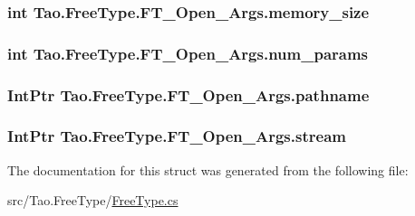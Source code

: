 \label{struct_tao_1_1_free_type_1_1_f_t___open___args_aafdbf467b031c162f7a0a8fd4f031f66}
\hypertarget{struct_tao_1_1_free_type_1_1_f_t___open___args_a2ad2c8ade3a312828754a9fccb93e2ac}{
\subsubsection[{memory\_\-size}]{\setlength{\rightskip}{0pt plus 5cm}int {\bf Tao.FreeType.FT\_\-Open\_\-Args.memory\_\-size}}}
\label{struct_tao_1_1_free_type_1_1_f_t___open___args_a2ad2c8ade3a312828754a9fccb93e2ac}
\hypertarget{struct_tao_1_1_free_type_1_1_f_t___open___args_a7c5a535b09dbf49db1abff2dfc435f09}{
\subsubsection[{num\_\-params}]{\setlength{\rightskip}{0pt plus 5cm}int {\bf Tao.FreeType.FT\_\-Open\_\-Args.num\_\-params}}}
\label{struct_tao_1_1_free_type_1_1_f_t___open___args_a7c5a535b09dbf49db1abff2dfc435f09}
\hypertarget{struct_tao_1_1_free_type_1_1_f_t___open___args_ad80d3dbe0301daf05ad1c81d97560d6b}{
\subsubsection[{pathname}]{\setlength{\rightskip}{0pt plus 5cm}IntPtr {\bf Tao.FreeType.FT\_\-Open\_\-Args.pathname}}}
\label{struct_tao_1_1_free_type_1_1_f_t___open___args_ad80d3dbe0301daf05ad1c81d97560d6b}
\hypertarget{struct_tao_1_1_free_type_1_1_f_t___open___args_a9afc3822bc375ee541f4bcfd1b4bec52}{
\subsubsection[{stream}]{\setlength{\rightskip}{0pt plus 5cm}IntPtr {\bf Tao.FreeType.FT\_\-Open\_\-Args.stream}}}
\label{struct_tao_1_1_free_type_1_1_f_t___open___args_a9afc3822bc375ee541f4bcfd1b4bec52}


The documentation for this struct was generated from the following file:\begin{DoxyCompactItemize}
\item 
src/Tao.FreeType/\hyperlink{_free_type_8cs}{FreeType.cs}\end{DoxyCompactItemize}
